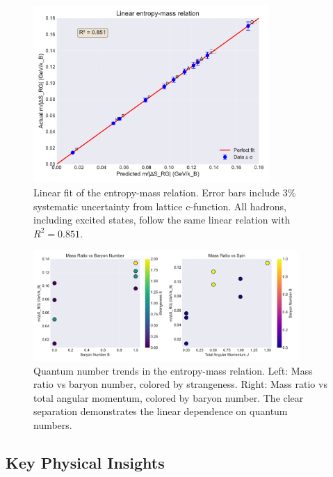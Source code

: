 \documentclass[12pt,a4paper]{article}
\begin{document}
\begin{figure}[H]
\centering
\includegraphics[width=0.8\textwidth]{figures/linear_fit.pdf}
\caption{Linear fit of the entropy-mass relation. Error bars include 3\% systematic uncertainty from lattice c-function. All hadrons, including excited states, follow the same linear relation with $R^2 = 0.851$.}
\label{fig:linearfit}
\end{figure}

\begin{figure}[H]
\centering
\includegraphics[width=0.9\textwidth]{figures/quantum_trends.pdf}
\caption{Quantum number trends in the entropy-mass relation. Left: Mass ratio vs baryon number, colored by strangeness. Right: Mass ratio vs total angular momentum, colored by baryon number. The clear separation demonstrates the linear dependence on quantum numbers.}
\label{fig:trends}
\end{figure}

\subsection{Key Physical Insights}
\end{document}
